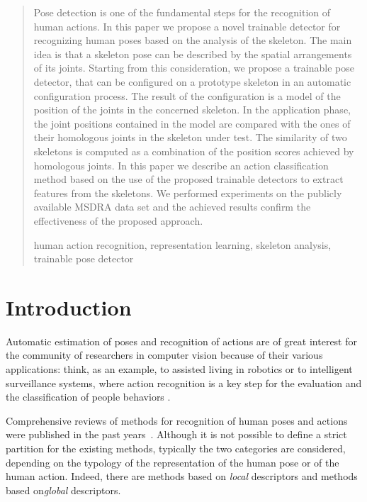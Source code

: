 \documentclass[runningheads,a4paper]{llncs}
\newcommand{\keywords}[1]{\par\addvspace\baselineskip
\noindent\keywordname\enspace\ignorespaces#1}
\begin{document}
\begin{abstract}
Pose detection is one of the fundamental steps for the recognition of human actions.
In this paper we propose a novel trainable detector for recognizing human poses based on the analysis of the skeleton. 
The main idea is that a skeleton pose can be described by the spatial arrangements of its joints.
Starting from this consideration, we propose a trainable pose detector, that can be configured on a prototype skeleton in an automatic configuration process. The result of the configuration is a model of the position of the joints in the concerned skeleton. In the application phase, the joint positions contained in the model are compared with the ones of their homologous joints in the skeleton under test. The similarity of two skeletons is computed as a combination of the position scores achieved by homologous joints.
In this paper we describe an action classification method based on the use of the proposed trainable detectors to extract features from the skeletons. We performed experiments on the publicly available MSDRA data set and the achieved results confirm the effectiveness of the proposed approach.

\keywords{human action recognition, representation learning, skeleton analysis, trainable pose detector}
\end{abstract}

\graphicspath{ {./figures/}
			{./figures/configuration/}
			{./figures/application/}
			{./figures/dataset/}}		

\section{Introduction}
Automatic estimation of poses and recognition of actions are of great interest for the community of researchers in computer vision because of their various applications: think, as an example, to assisted living in robotics or to intelligent surveillance systems, where action recognition is a key step for the evaluation and the classification of people behaviors \cite{avss_deep}. 

Comprehensive reviews of methods for recognition of human poses and actions were published in the past years~\cite{Poppe10,Aggarwal11}. Although it is not possible to define a strict partition for the existing methods, typically the two categories are considered, depending on the typology of  the representation of the human pose or of the human action. Indeed, there are methods based on \emph{local} descriptors and methods based on\emph{global} descriptors. 
\end{document}

